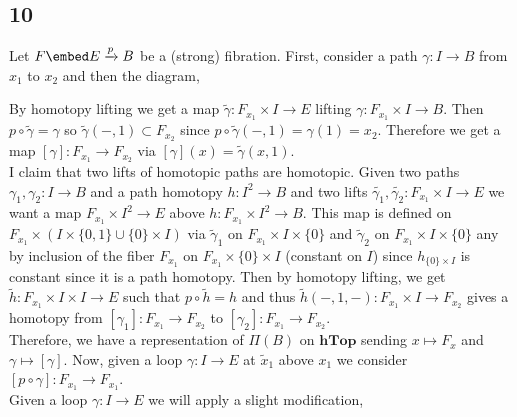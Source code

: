 \documentclass[12pt]{extarticle}
\begin{document}
\subsection{10}

Let $F \embed E \xrightarrow{p} B$ be a (strong) fibration.
First, consider a path $\gamma : I \to B$ from $x_1$ to $x_2$ and then the diagram,
\begin{center}
\end{center}
By homotopy lifting we get a map $\tilde{\gamma} : F_{x_1} \times I \to E$ lifting $\gamma : F_{x_1} \times I \to B$. Then $p \circ \tilde{\gamma} = \gamma$ so $\tilde{\gamma}(-, 1) \subset F_{x_2}$ since $p \circ \tilde{\gamma}(-,1) = \gamma(1) = x_2$. Therefore we get a map $[\gamma] : F_{x_1} \to F_{x_2}$ via $[\gamma](x) = \tilde{\gamma}(x, 1)$. 
\bigskip\\
I claim that two lifts of homotopic paths are homotopic. Given two paths $\gamma_1, \gamma_2 : I \to B$ and a path homotopy $h : I^2 \to B$ and two lifts $\tilde{\gamma_1}, \tilde{\gamma_2} : F_{x_1} \times I \to E$ we want a map $F_{x_1} \times I^2 \to E$ above $h : F_{x_1} \times I^2 \to B$. This map is defined on $F_{x_1} \times (I \times \{ 0, 1 \} \cup \{ 0 \} \times I)$ via $\tilde{\gamma}_1$ on $F_{x_1} \times I \times \{0\}$ and $\tilde{\gamma}_2$ on $F_{x_1} \times I \times \{0\}$ any by inclusion of the fiber $F_{x_1}$ on $F_{x_1} \times \{ 0 \} \times I$ (constant on $I$) since $h_ {\{0\} \times I}$ is constant since it is a path homotopy. Then by homotopy lifting, we get $\tilde{h} : F_{x_1} \times I \times I \to E$ such that $p \circ \tilde{h} = h$ and thus $\tilde{h}(-, 1, -) : F_{x_1} \times I \to F_{x_2}$ gives a homotopy from $[\gamma_1] : F_{x_1} \to F_{x_2}$ to $[\gamma_2] : F_{x_1} \to F_{x_2}$. 
\bigskip\\
Therefore, we have a representation of $\Pi(B)$ on $\mathbf{hTop}$ sending $x \mapsto F_x$ and $\gamma \mapsto [\gamma]$. Now, given a loop $\gamma : I \to E$ at $\tilde{x}_1$ above $x_1$ we consider $[p \circ \gamma] : F_{x_1} \to F_{x_1}$. 
\bigskip\\
Given a loop $\gamma : I \to E$ we will apply a slight modification, 
\begin{center}
\end{center}
\end{document}
